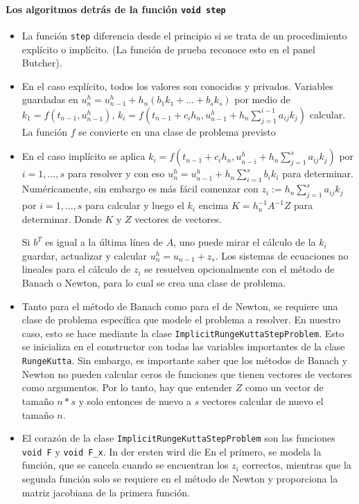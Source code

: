 \documentclass[a4paper,11pt]{article}
\theoremstyle{definition}
\begin{document}
\paragraph{Los algoritmos detrás de la función \lstinline{void step}}
\begin{itemize}
\item La función \lstinline{step} diferencia desde el principio si se trata de un 
procedimiento explícito o implícito. (La función de prueba reconoce esto en el panel Butcher).
\item En el caso explícito, todos los valores son conocidos y privados.
   Variables guardadas en
  $u_{n}^h = u_{n-1}^h +h_n(b_1k_1+...+b_sk_s)$ por medio de
  $k_1 = f(t_{n-1},u_{n-1}^h)$,
  $k_i = f(t_{n-1}+c_ih_n, u_{n-1}^h+h_n \sum_{j=1}^{i-1}a_{ij}k_j)$
  calcular. La función $ f $ se convierte en una clase de problema previsto
\item En el caso implícito se aplica $k_i = f(t_{n-1}+c_ih_n,
  u_{n-i}^h+h_n \sum_{j=1}^s a_{ij}k_j)$ por $i = 1,...,s$ para resolver y con eso 
 $u_n^h = u_{n-1}^h + h_n \sum_{i = 1}^s b_ik_i $ para determinar. 
 Numéricamente, sin embargo es más fácil comenzar con $z_i := h_n
  \sum_{j=1}^s a_{ij}k_j$ por $i = 1,...,s$ para calcular y luego el
  $k_i$ encima $K= h_n^{-1}A^{-1}Z$ para determinar. Donde $K$ y $Z$
  vectores de vectores.

  Si $b^T$ es igual a la última línea de $A$, uno puede mirar el cálculo de 
  la $k_i$ guardar, actualizar y calcular $u_n^h = u_{n-1}+z_s$. 
  Los sistemas de ecuaciones no lineales para el cálculo de $ z_i $ 
  se resuelven opcionalmente con el método de Banach o Newton, para lo cual se crea una clase de problema.

\item Tanto para el método de Banach como para el de Newton, se requiere una clase de 
  problema específica que modele el problema a resolver. En nuestro caso, esto se hace mediante la clase  \lstinline{ImplicitRungeKuttaStepProblem}. Esto se inicializa en el constructor con todas las variables 
importantes de la clase \lstinline{RungeKutta}. Sin embargo, es importante saber que los métodos de Banach y Newton 
no pueden calcular ceros de funciones que tienen vectores de vectores como argumentos. Por lo tanto, hay que entender $Z$ como un vector de tamaño $n * s$ y solo entonces de nuevo a $s$ vectores
calcular de nuevo el tamaño $n$.

\item El corazón de la clase
  \lstinline{ImplicitRungeKuttaStepProblem} son las funciones
  \lstinline{void F} y \lstinline{void F_x}. In der ersten wird die
  En el primero, se modela la función, que se cancela cuando se encuentran los $ z_i $ correctos, 
  mientras que la segunda función solo se requiere en el método de Newton y proporciona la matriz 
  jacobiana de la primera función.


\end{itemize}
\end{document}
